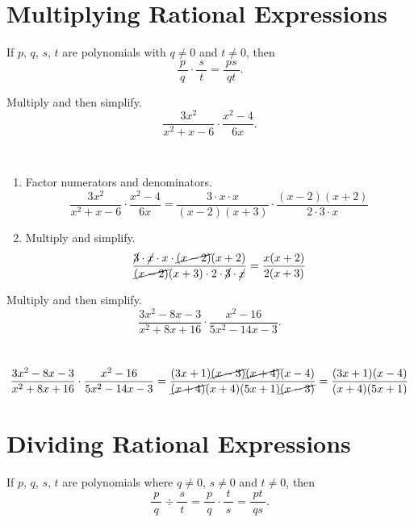 \documentclass[
  en,11pt]{elegantbook}
\let\BeginKnitrBlock\begin \let\EndKnitrBlock\end
\begin{document}
\hypertarget{multiplying-rational-expressions}{%
\section{Multiplying Rational Expressions}\label{multiplying-rational-expressions}}

If \(p\), \(q\), \(s\), \(t\) are polynomials with \(q\neq 0\) and \(t\neq 0\), then
\[
\dfrac{~p~}{~q~}\cdot\dfrac{~s~}{~t~}=\dfrac{~ps~}{~qt~}.
\]

\BeginKnitrBlock{example}
\protect\hypertarget{exm:unnamed-chunk-37}{}{\label{exm:unnamed-chunk-37} }
Multiply and then simplify.
\[\dfrac{3x^2}{x^2+x-6}\cdot\dfrac{x^2-4}{6x}.\]
\EndKnitrBlock{example}

\BeginKnitrBlock{solution}
{}\\

\begin{enumerate}
\def\labelenumi{\arabic{enumi}.}
\item
  Factor numerators and denominators.
  \[
   \dfrac{3x^2}{x^2+x-6}\cdot\dfrac{x^2-4}{6x}=\dfrac{3\cdot x\cdot x}{(x-2)(x+3)}\cdot\dfrac{(x-2)(x+2)}{2\cdot3\cdot x}
  \]
\item
  Multiply and simplify.
  \[
   \dfrac{\cancel{3}\cdot \cancel{x}\cdot x\cdot\cancel{(x-2)}(x+2)}{\cancel{(x-2)}(x+3)\cdot 2\cdot\cancel{3}\cdot \cancel{x}}=\dfrac{x(x+2)}{2(x+3)}
  \]
\end{enumerate}
\EndKnitrBlock{solution}

\BeginKnitrBlock{example}
\protect\hypertarget{exm:unnamed-chunk-39}{}{\label{exm:unnamed-chunk-39} }
Multiply and then simplify.
\[
\dfrac{3x^2-8x-3}{x^2+8x+16}\cdot\dfrac{x^2-16}{5x^2-14x-3}.
\]
\EndKnitrBlock{example}

\BeginKnitrBlock{solution}
{}\\

\[
\dfrac{3x^2-8x-3}{x^2+8x+16}\cdot\dfrac{x^2-16}{5x^2-14x-3}
=\dfrac{(3x+1)\cancel{(x-3)}\cancel{(x+4)}(x-4)}{\cancel{(x+4)}(x+4)(5x+1)\cancel{(x-3)}}
=\dfrac{(3x+1)(x-4)}{(x+4)(5x+1)}
\]
\EndKnitrBlock{solution}

\hypertarget{dividing-rational-expressions}{%
\section{Dividing Rational Expressions}\label{dividing-rational-expressions}}

If \(p\), \(q\), \(s\), \(t\) are polynomials where \(q\neq 0\), \(s\neq 0\) and \(t\neq 0\), then
\[
\dfrac{~p~}{~q~}\div\dfrac{~s~}{~t~}=\dfrac{~p~}{~q~}\cdot\dfrac{~t~}{~s~}=\dfrac{~pt~}{~qs~}.
\]
\end{document}
